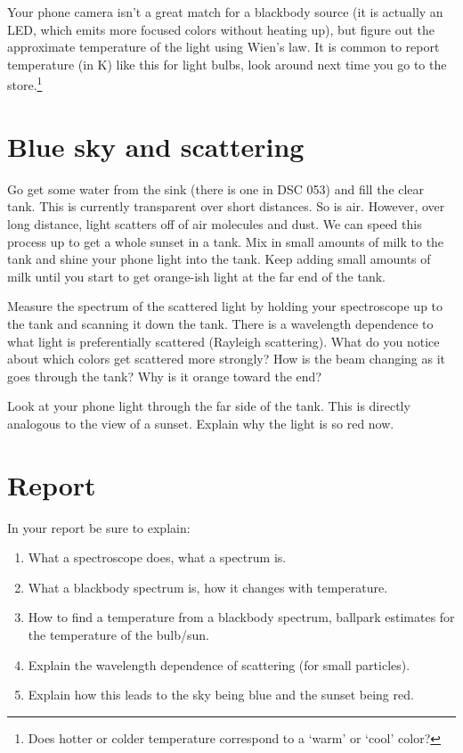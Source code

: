 \documentclass[phy1200]{handout}
\begin{document}
Your phone camera isn't a great match for a blackbody source (it is actually an LED, which emits more focused colors without heating up), but figure out the approximate temperature of the light using Wien's law. It is common to report temperature (in K) like this for light bulbs, look around next time you go to the store.\footnote{Does hotter or colder temperature correspond to a `warm' or `cool' color?}

\section{Blue sky and scattering}
Go get some water from the sink (there is one in DSC 053) and fill the clear tank. This is currently transparent over short distances. So is air. However, over long distance, light scatters off of air molecules and dust. We can speed this process up to get a whole sunset in a tank. Mix in small amounts of milk to the tank and shine your phone light into the tank. Keep adding small amounts of milk until you start to get orange-ish light at the far end of the tank.

Measure the spectrum of the scattered light by holding your spectroscope up to the tank and scanning it down the tank. There is a wavelength dependence to what light is preferentially scattered (Rayleigh scattering). What do you notice about which colors get scattered more strongly? How is the beam changing as it goes through the tank? Why is it orange toward the end? 

Look at your phone light through the far side of the tank. This is directly analogous to the view of a sunset. Explain why the light is so red now.

\section{Report}
In your report be sure to explain:
\begin{enumerate}
    \item What a spectroscope does, what a spectrum is.
    \item What a blackbody spectrum is, how it changes with temperature.
    \item How to find a temperature from a blackbody spectrum, ballpark estimates for the temperature of the bulb/sun.
    \item Explain the wavelength dependence of scattering (for small particles).
    \item Explain how this leads to the sky being blue and the sunset being red.
\end{enumerate}
\end{document}
